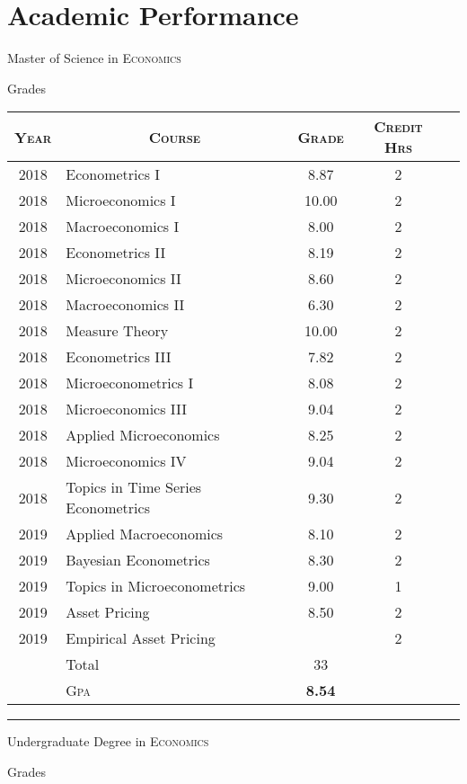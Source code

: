 \section{Academic Performance}
\newpage
\par{\centering\Large \hypertarget{msc_grades}{Master of Science in \textsc{Economics}}\par}\large{\centering Grades\par}\normalsize
\begin{center}
\begin{tabular}{clccc}
\textsc{Year}&\multicolumn{1}{c}{\textsc{Course}}&\textsc{Grade}&\textsc{Credit Hrs}\\ \hline
2018& Econometrics I &8.87&	2\\
2018& Microeconomics I &10.00&	2\\
2018& Macroeconomics I &8.00&	2\\
2018& Econometrics II	&8.19&	2\\
2018& Microeconomics II &8.60&	2\\
2018& Macroeconomics II	&6.30 & 2\\
2018& Measure Theory &10.00 & 2 \\
2018& Econometrics III	&7.82&	2\\
2018& Microeconometrics I	&8.08&	2\\
2018& Microeconomics III &9.04& 2\\
2018& Applied Microeconomics	&8.25&	2\\
2018& Microeconomics IV	&9.04&	2\\ 
2018& Topics in Time Series Econometrics  &9.30& 2\\
2019& Applied Macroeconomics  &8.10& 2 \\
2019& Bayesian Econometrics    &8.30& 2 \\
2019& Topics in  Microeconometrics &9.00& 1 \\
2019& Asset Pricing &8.50& 2 \\
2019& Empirical Asset Pricing && 2\\
& Total&33\\\cline{2-3}
&\textsc{Gpa}&\textbf{8.54}
\end{tabular}
\end{center}
\bigskip
\hrule
\bigskip
\par{\centering\Large \hypertarget{ba_grades}{Undergraduate Degree in \textsc{Economics}}\par}\large{\centering Grades\par}\normalsize

